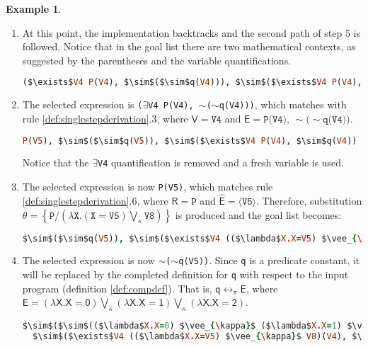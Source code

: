 \documentclass[inscr,ack,preface]{dithesis}
\theoremstyle{definition}
\newtheorem{example}{Example}[chapter]
\newcommand{\msf}[1]{$\mathsf{#1}$}
\begin{document}
\begin{example}
\begin{enumerate}
\item At this point, the implementation backtracks and the second path of step 5 is followed. Notice that in the goal list there are two mathematical contexts, as suggested by the parentheses and the variable quantifications.
\begin{lstlisting}[language=Prolog,%
  frame=single,breaklines=false,mathescape=true]
  ($\exists$V4 P(V4), $\sim$($\sim$q(V4))), $\sim$($\exists$V4 P(V4), $\sim$q(V4)) ?
\end{lstlisting}

\item The selected expression is \texttt{($\exists$V4 P(V4), $\sim$($\sim$q(V4)))}, which matches with rule \ref{def:singlestepderivation}.3, where \msf{V = \texttt{V4}} and \msf{E = \texttt{P(V4), $\sim$($\sim$q(V4))}}.
\begin{lstlisting}[language=Prolog,%
  frame=single,breaklines=false,mathescape=true]
  P(V5), $\sim$($\sim$q(V5)), $\sim$($\exists$V4 P(V4), $\sim$q(V4)) ?
\end{lstlisting}
Notice that the \texttt{$\exists$V4} quantification is removed and a fresh variable is used.

\item The selected expression is now \texttt{P(V5)}, which matches rule \ref{def:singlestepderivation}.6, where \msf{R = \texttt{P}} and \msf{\widehat{E} = \langle \texttt{V5} \rangle}.
Therefore, substitution \msf{\theta = \left\{ \texttt{P} / \left( \lambda \texttt{X}. (\texttt{X} = \texttt{V5}) \bigvee_{\kappa} \texttt{V8} \right) \right\}} is produced and the goal list becomes:
\begin{lstlisting}[language=Prolog,%
  frame=single,breaklines=false,mathescape=true]
  $\sim$($\sim$q(V5)), $\sim$($\exists$V4 (($\lambda$X.X=V5) $\vee_{\kappa}$ V8)(V4), $\sim$q(V4)) ?
\end{lstlisting}

\item The selected expression is now \texttt{$\sim$($\sim$q(V5))}. Since \texttt{q} is a predicate constant, it will be replaced by the completed definition for \texttt{q} with respect to the input program (definition \ref{def:compdef}). That is, \msf{q \leftrightarrow_{\pi} E}, where \msf{E = (\lambda X. X=0) \bigvee_{\kappa} (\lambda X. X=1) \bigvee_{\kappa} (\lambda X. X=2)}.
\begin{lstlisting}[language=Prolog,%
  frame=single,breaklines=false,mathescape=true]
  $\sim$($\sim$(($\lambda$X.X=0) $\vee_{\kappa}$ ($\lambda$X.X=1) $\vee_{\kappa}$ ($\lambda$X.X=2))(V5)),
  $\sim$($\exists$V4 (($\lambda$X.X=V5) $\vee_{\kappa}$ V8)(V4), $\sim$q(V4)) ?
\end{lstlisting}


\end{enumerate}
\end{example}
\end{document}
